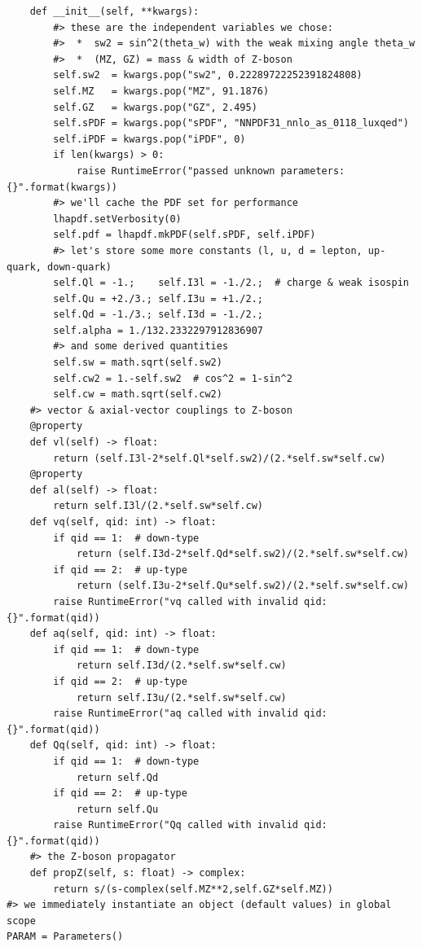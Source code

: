 \documentclass[11pt]{article}
\begin{document}
\begin{verbatim}
    def __init__(self, **kwargs):
        #> these are the independent variables we chose:
        #>  *  sw2 = sin^2(theta_w) with the weak mixing angle theta_w
        #>  *  (MZ, GZ) = mass & width of Z-boson
        self.sw2  = kwargs.pop("sw2", 0.22289722252391824808)
        self.MZ   = kwargs.pop("MZ", 91.1876)
        self.GZ   = kwargs.pop("GZ", 2.495)
        self.sPDF = kwargs.pop("sPDF", "NNPDF31_nnlo_as_0118_luxqed")
        self.iPDF = kwargs.pop("iPDF", 0)
        if len(kwargs) > 0:
            raise RuntimeError("passed unknown parameters: {}".format(kwargs))
        #> we'll cache the PDF set for performance
        lhapdf.setVerbosity(0)
        self.pdf = lhapdf.mkPDF(self.sPDF, self.iPDF)
        #> let's store some more constants (l, u, d = lepton, up-quark, down-quark)
        self.Ql = -1.;    self.I3l = -1./2.;  # charge & weak isospin
        self.Qu = +2./3.; self.I3u = +1./2.;
        self.Qd = -1./3.; self.I3d = -1./2.;
        self.alpha = 1./132.2332297912836907
        #> and some derived quantities
        self.sw = math.sqrt(self.sw2)
        self.cw2 = 1.-self.sw2  # cos^2 = 1-sin^2
        self.cw = math.sqrt(self.cw2)
    #> vector & axial-vector couplings to Z-boson
    @property
    def vl(self) -> float:
        return (self.I3l-2*self.Ql*self.sw2)/(2.*self.sw*self.cw)
    @property
    def al(self) -> float:
        return self.I3l/(2.*self.sw*self.cw)
    def vq(self, qid: int) -> float:
        if qid == 1:  # down-type
            return (self.I3d-2*self.Qd*self.sw2)/(2.*self.sw*self.cw)
        if qid == 2:  # up-type
            return (self.I3u-2*self.Qu*self.sw2)/(2.*self.sw*self.cw)
        raise RuntimeError("vq called with invalid qid: {}".format(qid))
    def aq(self, qid: int) -> float:
        if qid == 1:  # down-type
            return self.I3d/(2.*self.sw*self.cw)
        if qid == 2:  # up-type
            return self.I3u/(2.*self.sw*self.cw)
        raise RuntimeError("aq called with invalid qid: {}".format(qid))
    def Qq(self, qid: int) -> float:
        if qid == 1:  # down-type
            return self.Qd
        if qid == 2:  # up-type
            return self.Qu
        raise RuntimeError("Qq called with invalid qid: {}".format(qid))
    #> the Z-boson propagator
    def propZ(self, s: float) -> complex:
        return s/(s-complex(self.MZ**2,self.GZ*self.MZ))
#> we immediately instantiate an object (default values) in global scope
PARAM = Parameters()


\end{verbatim}
\end{document}
